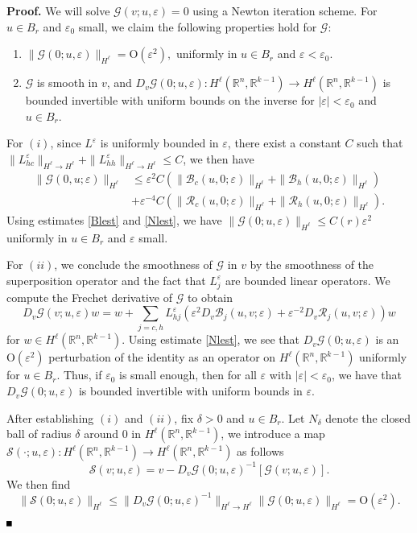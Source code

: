 \documentclass[10pt]{article}
\newenvironment{Proof}%
 {\begin{trivlist} \item[]{\bf Proof. }}%
 {\hspace*{\fill}$\rule{.4\baselineskip}{.4\baselineskip}$\end{trivlist}}
\newcommand{\R}{\mathbb{R}}
\newcommand{\rmO}{\mathrm{O}}
\newcommand{\eps}{\varepsilon}
\newcommand{\G}{\mathcal{G}}
\newcommand{\cS}{\mathcal{S}}
\newcommand{\Rm}{\mathcal{R}}
\begin{document}
\begin{Proof}We will solve $\G(v;u,\eps)=0$ using a Newton iteration scheme. For $u \in B_r$ and $\eps_0$ small, we claim the following properties hold for $\G$:
\begin{enumerate}
\item $\|\G(0;u,\eps)\|_{H^\ell} = \rmO(\eps^2),$ uniformly in $u\in B_r$ and $\eps < \eps_0$.
\item $\G$ is smooth in $v$, and $D_v \G(0; u, \eps):H^\ell(\R^n,\R^{k-1}) \to H^\ell(\R^n,\R^{k-1})$ is bounded invertible with uniform bounds on the inverse for $|\eps|<\eps_0$ and $u \in B_r$. 
\end{enumerate}

For $(i)$, since $L^\eps$ is uniformly bounded in $\eps$, there exist a constant $C$ such that $\| L_{hc}^\eps\|_{H^\ell \to H^\ell}+\| L_{hh}^\eps \|_{H^\ell \to H^\ell } \le C$, we then have
\begin{align*}
\|\G(0,u;\eps)\|_{H^\ell} &\le \eps^2C(\|\mathcal{B}_c(u,0;\eps)\|_{H^\ell} +\|\mathcal{B}_h(u,0;\eps)\|_{H^\ell})\\
&+\eps^{-4}C(\|\Rm_c(u,0;\eps)\|_{H^\ell}+\|\Rm_h(u,0;\eps)\|_{H^\ell}).
\end{align*}
Using estimates \eqref{Blest} and \eqref{Nlest}, we have $\|\G(0;u,\eps)\|_{H^\ell} \le C(r) \eps^2$ uniformly in $u\in B_r$ and $\eps$ small.

For $(ii)$, we conclude the smoothness of $\mathcal{G}$ in $v$ by the smoothness of the superposition operator and the fact that $L^\eps_j$ are bounded linear operators. We compute the Frechet derivative of $\G$ to obtain
\[ 
D_v\G(v;u,\eps) w = w+ \sum_{j=c,h} L_{hj}^\eps (\eps^2 D_v \mathcal{B}_j (u,v;\eps)+ \eps^{-2} D_v\Rm_j(u,v;\eps) ) w
\] 
for $w \in H^\ell(\R^n,\R^{k-1})$. Using estimate \eqref{Nlest}, we see that $D_v\G(0; u, \eps)$ is an $\rmO(\eps^2)$ perturbation of the identity as an operator on $H^\ell(\R^n,\R^{k-1})$ uniformly for $u \in B_r$. Thus, if $\eps_0$ is small enough, then for all $\eps$ with $|\eps|<\eps_0$, we have that $D_v\G(0;u,\eps)$ is bounded invertible with uniform bounds in $\eps$.


After establishing $(i)$ and $(ii)$, fix $\delta>0$ and $u \in B_r$. Let $N_\delta$ denote the closed ball of radius $\delta$ around $0$ in $H^\ell(\R^n,\R^{k-1})$, we introduce a map $\cS(\cdot; u,\eps): H^\ell(\R^n,\R^{k-1}) \to H^\ell(\R^n,\R^{k-1})$ as follows
\[
\cS(v; u,\eps) = v - D_v\G(0;u, \eps)^{-1}[\G(v;u,\eps)].
\]
We then find
\[
\|\cS(0;u,\eps) \|_{H^\ell} \le \|D_v\G(0;u,\eps)^{-1}\|_{H^\ell\to H^\ell} \|\G(0;u, \eps)\|_{H^\ell} = \rmO(\eps^2).
\]


\end{Proof}
\end{document}
